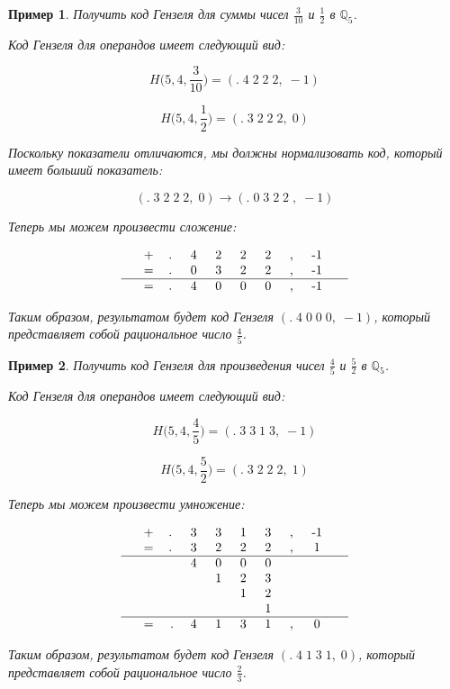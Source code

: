 \documentclass[master, och, diploma, times]{sty/SCWorks}
\theoremstyle{plain}
\newtheorem{exmp}{Пример}[section]
\theoremstyle{definition}
\numberwithin{equation}{section}
\begin{document}
\begin{exmp}
Получить код Гензеля для суммы чисел $\frac{3}{10}$ и $\frac{1}{2}$ в $\mathbb{Q}_5$.

\noindent Код Гензеля для операндов имеет следующий вид:

$$H\bigg(5,4, \frac{3}{10}\bigg)=(.\; 4\; 2\; 2\; 2,\; -1)$$

$$H\bigg(5,4, \frac{1}{2}\bigg)=(.\; 3\; 2\; 2\; 2,\; 0)$$


\noindent Поскольку показатели отличаются, мы должны нормализовать код, который имеет больший показатель:

$$ 
(.\; 3\; 2\; 2\; 2,\; 0) \rightarrow (.\; 0 \; 3\; 2\; 2\; ,\; -1)
$$

\noindent Теперь мы можем произвести сложение:

$$
\begin{tabular}{ccccccccccc}
& + & .\; & 4\; & 2\; & 2\; & 2\; & ,\; & -1\; &  \\
& = & .\; & 0\; & 3\; & 2\; & 2\; & ,\; & -1\; &  \\
\hline
& = & .\; & 4\; & 0\; & 0\; & 0\; & ,\; & -1\; &
\end{tabular}
$$


\noindent Таким образом, результатом будет код Гензеля $(.\; 4\; 0\; 0\; 0,\; -1)$, который представляет собой рациональное число $\frac{4}{5}$.
\end{exmp}

\begin{exmp}
Получить код Гензеля для произведения чисел $\frac{4}{5}$ и $\frac{5}{2}$ в $\mathbb{Q}_5$.

\noindent Код Гензеля для операндов имеет следующий вид:

$$H\bigg(5,4, \frac{4}{5}\bigg)=(.\; 3\; 3\; 1\; 3,\; -1)$$

$$H\bigg(5,4, \frac{5}{2}\bigg)=(.\; 3\; 2\; 2\; 2,\; 1)$$

\noindent Теперь мы можем произвести умножение:

$$
\begin{tabular}{cccccccccc}
& + & .\; & 3\; & 3\; & 1\; & 3\; & ,\; & -1\; \\
& = & .\; & 3\; & 2\; & 2\; & 2\; & ,\; & 1\; \\
\hline
& & & 4\; & 0\; & 0\; & 0\; & & & \\
& & & & 1\; & 2\; & 3\; & & & \\
& & & & & 1\; & 2\; & & & \\
& & & & & & 1\; & & & \\
\hline
& = & . & 4\; & 1\; & 3\; & 1\; & ,\; & 0\; &
\end{tabular}
$$


\noindent Таким образом, результатом будет код Гензеля $(.\; 4\; 1\; 3\; 1,\; 0)$, который представляет собой рациональное число $\frac{2}{3}$.
\end{exmp}
\end{document}
